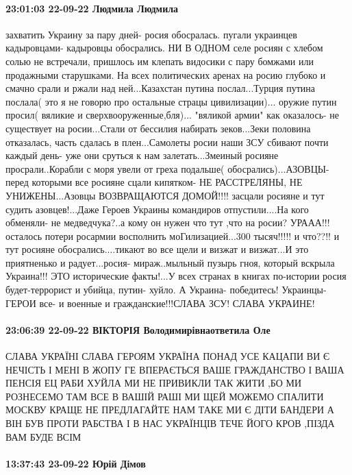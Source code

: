 \paragraph{23:01:03 22-09-22 Людмила Людмила}

захватить Украину за пару дней- росия обосралась. пугали украинцев кадыровцами-
кадыровцы обосрались. НИ В ОДНОМ селе росиян с хлебом солью не встречали,
пришлось им клепать видосики с пару бомжами или продажными старушками. На всех
политических аренах на росию глубоко и смачно срали и ржали над ней...Казахстан
путина послал...Турция путина послала( это я не говорю про остальные страцы
цивилизации)... оружие путин просил( вяликие и сверхвооруженные,бля)...
"вяликой армии" как оказалось- не существует на росии...Стали от бессилия
набирать зеков...Зеки половина отказалась, часть сдалась в плен...Самолеты
росии наши ЗСУ сбивают почти каждый день- уже они сруться к нам
залетать...Змеиный росияне просрали..Корабли с моря увели от греха подальше(
обосрались)...АЗОВЦЫ- перед которыми все росияне сцали кипятком- НЕ
РАССТРЕЛЯНЫ, НЕ УНИЖЕНЫ...Азовцы ВОЗВРАЩАЮТСЯ ДОМОЙ!!!! засцали росияне и тут
судить азовцев!...Даже Героев Украины командиров отпустили....На кого обменяли-
не медведчука?..а кому он нужен что тут ,что на росии? УРААА!!! осталось потери
росармии восполнить моГилизацией...300 тысяч!!!!! и что??!! и тут росияне
обосрались....тикают во все щели и визжат и визжат...И это приятненько и
радует...росия- мираж..мыльный пузырь гноя, который вскрыла Украина!!! ЭТО
исторические факты!...У всех странах в книгах по-истории росия будет-террорист
и убийца, путин- хуйло. А Украина- победитесь! Украинцы- ГЕРОИ все- и военные и
гражданские!!!СЛАВА ЗСУ! СЛАВА УКРАИНЕ!

\paragraph{23:06:39 22-09-22 ВІКТОРІЯ Володимирівнаответила Оле}

СЛАВА УКРАЇНІ СЛАВА ГЕРОЯМ УКРАЇНА ПОНАД УСЕ КАЦАПИ ВИ Є НЕЧІСТЬ І МЕНІ В ЖОПУ
ГЕ ВПЕРАЄТЬСЯ ВАШЕ ГРАЖДАНСТВО І ВАША ПЕНСІЯ ЕЦ РАБИ ХУЙЛА МИ НЕ ПРИВИКЛИ ТАК
ЖИТИ ,БО МИ РОЗНЕСЕМО ТАМ ВСЕ В ВАШІЙ РАШІ МИ ЩЕЙ МОЖЕМО СПАЛИТИ МОСКВУ КРАЩЕ
НЕ ПРЕДЛАГАЙТЕ НАМ ТАКЕ МИ Є ДІТИ БАНДЕРИ А ВІН БУВ ПРОТИ РАБСТВА І В НАС
УКРАЇНЦІВ ТЕЧЕ ЙОГО КРОВ ,ПІЗДА ВАМ БУДЕ ВСІМ



\paragraph{13:37:43 23-09-22 Юрій Дімов}

